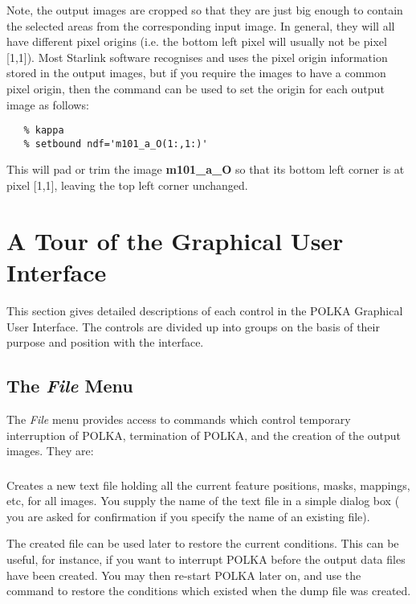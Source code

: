 Note, the output images are cropped so that they are just big enough to
contain the selected areas from the corresponding input image. In
general, they will all have different pixel origins (i.e. the bottom left
pixel will usually not be pixel [1,1]). Most Starlink software recognises
and uses the pixel origin information stored in the output images, but if
you require the images to have a common pixel origin, then the
 command 
can be used to set the origin for each output image as follows:

\begin{verbatim}
   % kappa
   % setbound ndf='m101_a_O(1:,1:)' 
\end{verbatim}

This will pad or trim the image {\bf m101\_a\_O} so that its bottom left 
corner is at pixel [1,1], leaving the top left corner unchanged.

\section {A Tour of the Graphical User Interface}
This section gives detailed descriptions of each control in the POLKA 
Graphical User Interface. The controls are divided up into groups on the
basis of their purpose and position with the interface.

\subsection {The {\em File} Menu}
The {\em File} menu provides access to commands which control
temporary interruption of POLKA,
termination of POLKA, and the creation of the output images. They are:

\subsubsection {} 
Creates a new text file holding all the current feature positions, masks,
mappings, etc, for all images. You supply the name of the text file in a
simple dialog box ( you are asked for confirmation if you specify the
name of an existing file).

The created file can be used later to restore the current conditions.
This can be useful, for instance, if you want to interrupt POLKA before
the output data files have been created. You may then re-start POLKA
later on, and use the  command to
restore the conditions which existed when the dump file was created.

